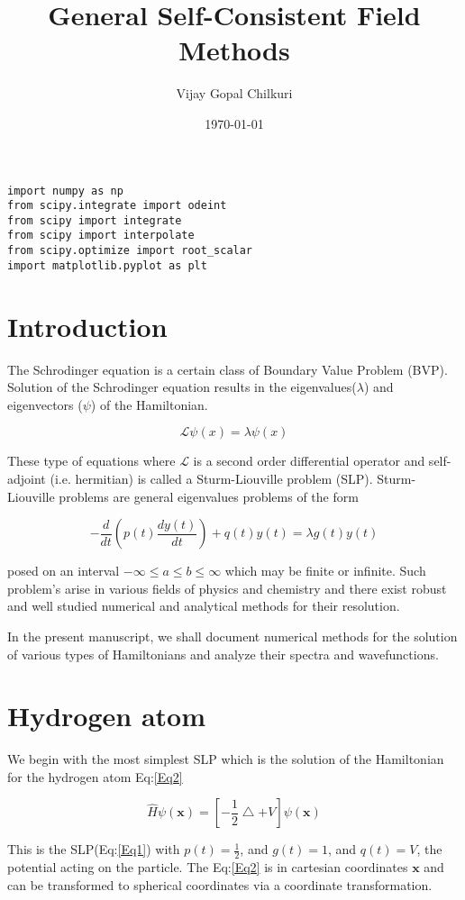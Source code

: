 \documentclass[11pt,a4paper]{article}
\author{Vijay Gopal Chilkuri}
\date{\today}
\title{General Self-Consistent Field Methods}
\begin{document}
\maketitle
\tableofcontents


\begin{verbatim}
import numpy as np
from scipy.integrate import odeint
from scipy import integrate
from scipy import interpolate
from scipy.optimize import root_scalar
import matplotlib.pyplot as plt
\end{verbatim}

\section{Introduction}
\label{sec:org3667059}

The Schrodinger equation is a certain class of Boundary Value Problem (BVP).
Solution of the Schrodinger equation results in the eigenvalues(\(\lambda\)) and
eigenvectors (\(\psi\)) of the Hamiltonian.

\[
\mathcal{L}\psi(x) = \lambda\psi(x)
\]

These type of equations where \(\mathcal{L}\) is a second order differential
operator and self-adjoint (i.e. hermitian) is called a Sturm-Liouville problem (SLP).
Sturm-Liouville problems are general eigenvalues problems of the form

\[
-\frac{d}{dt}\left ( p(t) \frac{d y(t)}{dt} \right ) + q(t)y(t) = \lambda g(t)y(t)
\]

posed on an interval \(-\infty \le a \le b \le \infty\) which may be finite or infinite. Such
problem's arise in various fields of physics and chemistry and there exist
robust and well studied numerical and analytical methods for their resolution.

In the present manuscript, we shall document numerical methods for the solution
of various types of Hamiltonians and analyze their spectra and wavefunctions.

\section{Hydrogen atom}
\label{sec:org4f60c42}
We begin with the most simplest SLP which is the solution
of the Hamiltonian for the hydrogen atom Eq:\ref{Eq2}

\[
\hat{H}\psi(\mathbf{x}) = \left [ -\frac{1}{2}\bigtriangleup + V \right ]\psi(\mathbf{x})
\]

This is the SLP(Eq:\ref{Eq1}) with \(p(t)=\frac{1}{2}\), and \(g(t)=1\), and \(q(t)=V\), the potential acting
on the particle. The Eq:\ref{Eq2} is in cartesian coordinates \(\mathbf{x}\) and
can be transformed to spherical coordinates via a coordinate transformation.
\end{document}
